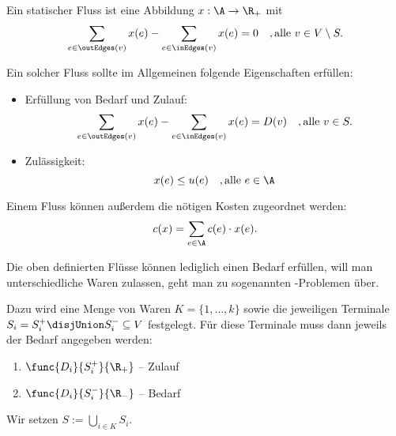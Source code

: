 \begin{definition}
    Ein statischer Fluss ist eine Abbildung $x : \A \rightarrow \R_+$ mit
    \[ \sum_{e \in \outEdges(v)} x(e) - \sum_{e \in \inEdges(v)} x(e) = 0
        \quad, \text{alle } v \in V \setminus S. \]

    Ein solcher Fluss sollte im Allgemeinen folgende Eigenschaften erfüllen:
    \begin{itemize}
        \item Erfüllung von Bedarf und Zulauf:
            \[ \sum_{e \in \outEdges(v)} x(e) - \sum_{e \in \inEdges(v)} x(e) = D(v)
                \quad, \text{alle } v \in S. \]
        \item Zulässigkeit:
            \[ x(e) \leq u(e) \quad, \text{alle } e \in \A \]
    \end{itemize}

    Einem Fluss können außerdem die nötigen Kosten zugeordnet werden:
        \[ c(x) = \sum_{e \in \A} c(e) \cdot x(e). \]
\end{definition}

\begin{definition}
    Die oben definierten Flüsse können lediglich einen Bedarf erfüllen, will
    man unterschiedliche Waren zulassen, geht man zu sogenannten
    -Problemen über.

    Dazu wird eine Menge von Waren $K = \{1, \ldots, k\}$ sowie die jeweiligen
    Terminale $S_i = S_i^+ \disjUnion S_i^- \subseteq V$ festgelegt. Für diese
    Terminale muss dann jeweils der Bedarf angegeben werden:
    \begin{enumerate}
        \item $\func{D_i}{S_i^+}{\R_+}$ -- Zulauf
        \item $\func{D_i}{S_i^-}{\R_-}$ -- Bedarf
    \end{enumerate}

    Wir setzen $S := \bigcup\limits_{i \in K} S_i$.
\end{definition}


